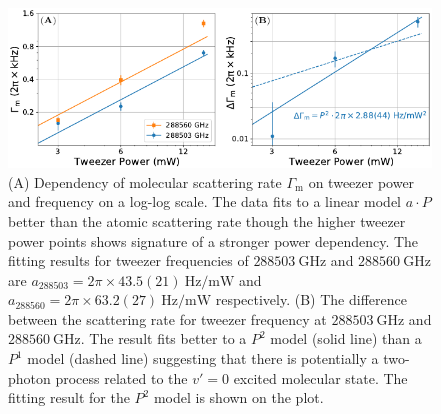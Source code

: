 \begin{figure}
  \centering
  \includegraphics[width=\textwidth]{figures/raman_transfer_scatter_scaling_mol2.pdf}
  \caption[Molecular scattering rate as a function of tweezer power and frequency]{
    (A) Dependency of molecular scattering rate $\Gamma_{\mathrm{m}}$
    on tweezer power and frequency on a log-log scale.
    The data fits to a linear model $a\cdot P$ better than the atomic scattering rate
    though the higher tweezer power points shows signature of a stronger power dependency.
    The fitting results for tweezer frequencies of
    $288503~\mathrm{GHz}$ and $288560~\mathrm{GHz}$ are
    $a_{288503}=2\pi\times43.5(21)~\mathrm{Hz/mW}$
    and $a_{288560}=2\pi\times63.2(27)~\mathrm{Hz/mW}$ respectively.
    (B) The difference between the scattering rate for tweezer frequency at
    $288503~\mathrm{GHz}$ and $288560~\mathrm{GHz}$.
    The result fits better to a $P^2$ model (solid line) than a $P^1$ model (dashed line)
    suggesting that there is potentially a two-photon process
    related to the $v'=0$ excited molecular state.
    The fitting result for the $P^2$ model is shown on the plot.
    \label{fig:raman-transfer:results:scaling:gamma-mol}}
\end{figure}

